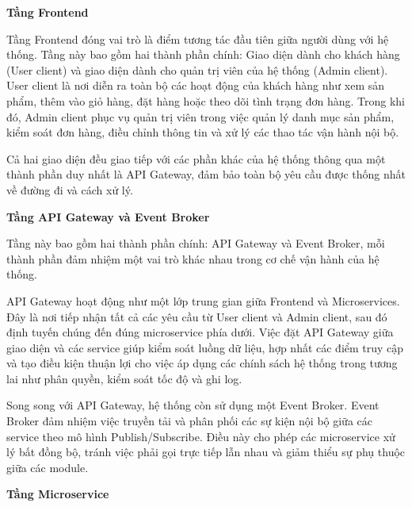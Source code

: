 \textbf{Tầng Frontend}

Tầng Frontend đóng vai trò là điểm tương tác đầu tiên giữa người dùng với hệ thống. Tầng này bao gồm hai thành phần chính: Giao diện dành cho khách hàng (User client) và giao diện dành cho quản trị viên của hệ thống (Admin client). User client là nơi diễn ra toàn bộ các hoạt động của khách hàng như xem sản phẩm, thêm vào giỏ hàng, đặt hàng hoặc theo dõi tình trạng đơn hàng. Trong khi đó, Admin client phục vụ quản trị viên trong việc quản lý danh mục sản phẩm, kiểm soát đơn hàng, điều chỉnh thông tin và xử lý các thao tác vận hành nội bộ.

Cả hai giao diện đều giao tiếp với các phần khác của hệ thống thông qua một thành phần duy nhất là API Gateway, đảm bảo toàn bộ yêu cầu được thống nhất về đường đi và cách xử lý.
\bigskip



\textbf{Tầng API Gateway và Event Broker}

Tầng này bao gồm hai thành phần chính: API Gateway và Event Broker, mỗi thành phần đảm nhiệm một vai trò khác nhau trong cơ chế vận hành của hệ thống.

API Gateway hoạt động như một lớp trung gian giữa Frontend và Microservices. Đây là nơi tiếp nhận tất cả các yêu cầu từ User client và Admin client, sau đó định tuyến chúng đến đúng microservice phía dưới. Việc đặt API Gateway giữa giao diện và các service giúp kiểm soát luồng dữ liệu, hợp nhất các điểm truy cập và tạo điều kiện thuận lợi cho việc áp dụng các chính sách hệ thống trong tương lai như phân quyền, kiểm soát tốc độ và ghi log.

Song song với API Gateway, hệ thống còn sử dụng một Event Broker. Event Broker đảm nhiệm việc truyền tải và phân phối các sự kiện nội bộ giữa các service theo mô hình Publish/Subscribe. Điều này cho phép các microservice xử lý bất đồng bộ, tránh việc phải gọi trực tiếp lẫn nhau và giảm thiểu sự phụ thuộc giữa các module.
\bigskip



\textbf{Tầng Microservice}

